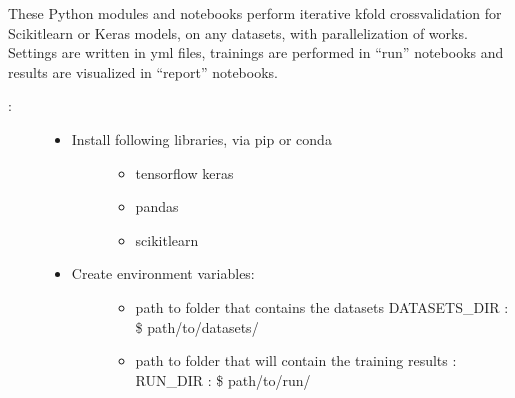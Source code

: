 \documentclass[letterpaper,10pt,english]{sphinxmanual}
\begin{document}
\sphinxAtStartPar
These Python modules and notebooks perform iterative k\sphinxhyphen{}fold crossvalidation for Scikit\sphinxhyphen{}learn or Keras models, on any datasets, with parallelization of works. Settings are written in yml files, trainings are performed in “run” notebooks and results are visualized in “report” notebooks.
\begin{description}
\item[{:}] \leavevmode\begin{itemize}
\item {} \begin{description}
\item[{Install following libraries, via pip or conda}] \leavevmode\begin{itemize}
\item {} 
\sphinxAtStartPar
tensorflow \sphinxhyphen{} keras

\item {} 
\sphinxAtStartPar
pandas

\item {} 
\sphinxAtStartPar
scikit\sphinxhyphen{}learn

\end{itemize}

\end{description}

\item {} \begin{description}
\item[{Create environment variables:}] \leavevmode\begin{itemize}
\item {} 
\sphinxAtStartPar
path to folder that contains the datasets DATASETS\_DIR : \$ path/to/datasets/

\item {} 
\sphinxAtStartPar
path to folder that will contain the training results : RUN\_DIR : \$ path/to/run/

\end{itemize}

\end{description}

\end{itemize}

\end{description}

\sphinxAtStartPar
{}
\end{document}
